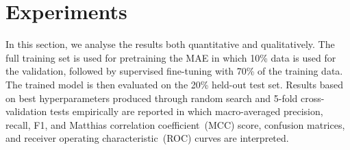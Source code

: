 \section{Experiments}\label{chapter_4:results}
In this section, we analyse the results both quantitative and qualitatively. 
The full training set is used for pretraining the MAE in which 10\% data is used for the validation, followed by supervised fine-tuning with 70\% of the training data. The trained model is then evaluated on the 20\% held-out test set. Results based on best hyperparameters produced through random search and 5-fold cross-validation tests empirically are reported in which macro-averaged precision, recall, F1, and Matthias correlation coefficient~(MCC) score, confusion matrices, and receiver operating characteristic~(ROC) curves are interpreted.

